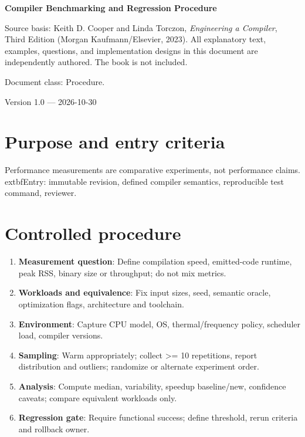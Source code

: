 \documentclass[10pt,letterpaper]{article}
\begin{document}
\hypersetup{pageanchor=false}%
\begin{titlepage}
\centering\vspace*{1.0in}
{\Huge\bfseries\textcolor{CompilerBlue}{Compiler Benchmarking and Regression Procedure}\par}
\vspace{.22in}{\Large Controlled engineering SOP\par}
\vspace{.4in}{\large Compiler Engineering Documentation Suite\par}
\vfill
\begin{minipage}{.86\linewidth}\small
Source basis: Keith D. Cooper and Linda Torczon, \emph{Engineering a Compiler}, Third Edition (Morgan Kaufmann/Elsevier, 2023). All explanatory text, examples, questions, and implementation designs in this document are independently authored. The book is not included.\par\medskip
Document class: Procedure.
\end{minipage}
\vfill\textcolor{CompilerGray}{Version 1.0 --- 2026-10-30}\par
\end{titlepage}\hypersetup{pageanchor=true}
\tableofcontents\clearpage
\section{Purpose and entry criteria}
Performance measurements are comparative experiments, not performance claims.
	extbf{Entry:} immutable revision, defined compiler semantics, reproducible test command, reviewer.

\section{Controlled procedure}
\begin{enumerate}
\item \textbf{Measurement question}: Define compilation speed, emitted-code runtime, peak RSS, binary size or throughput; do not mix metrics.
\item \textbf{Workloads and equivalence}: Fix input sizes, seed, semantic oracle, optimization flags, architecture and toolchain.
\item \textbf{Environment}: Capture CPU model, OS, thermal/frequency policy, scheduler load, compiler versions.
\item \textbf{Sampling}: Warm appropriately; collect >= 10 repetitions, report distribution and outliers; randomize or alternate experiment order.
\item \textbf{Analysis}: Compute median, variability, speedup baseline/new, confidence caveats; compare equivalent workloads only.
\item \textbf{Regression gate}: Require functional success; define threshold, rerun criteria and rollback owner.
\end{enumerate}
\end{document}
